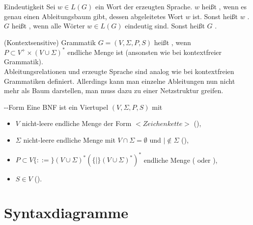 \begin{Def}{Eindeutigkeit}
    Sei $w \in L(G)$ ein Wort der erzeugten Sprache.
    $w$ heißt , wenn es genau einen Ableitungsbaum gibt,
    dessen abgeleitetes Wort $w$ ist.
    Sonst heißt $w$ . \\
    $G$ heißt , wenn alle Wörter $w \in L(G)$ eindeutig
    sind.
    Sonst heißt $G$ .
\end{Def}

\begin{Def}{(Kontextsensitive) Grammatik}
    $G = (V, \Sigma, P, S)$ heißt , wenn \\
    $P \subset V^+ \times (V \cup \Sigma)^\ast$ endliche Menge ist
    (ansonsten wie bei kontextfreier Grammatik). \\
    Ableitungsrelationen und erzeugte Sprache sind analog wie bei
    kontextfreien Grammatiken definiert.
    Allerdings kann man einzelne Ableitungen nun nicht mehr als Baum
    darstellen, man muss dazu zu einer Netzstruktur greifen.
\end{Def}

\begin{Def}{--Form}
    Eine BNF ist ein Viertupel $(V, \Sigma, P, S)$ mit
    \begin{itemize}
        \item $V$ nicht-leere endliche Menge der Form
        $<\!\!Zeichenkette\!\!>$ (),

        \item $\Sigma$ nicht-leere endliche Menge mit
        $V \cap \Sigma = \emptyset$ und $| \notin \Sigma$
        (),

        \item $P \subset V \{::=\}
        (V \cup \Sigma)^\ast (\{|\} (V \cup \Sigma)^\ast)^\ast$
        endliche Menge ( oder ),

        \item $S \in V$ ().
    \end{itemize}
\end{Def}

\pagebreak

\section{%
    Syntaxdiagramme%
}

